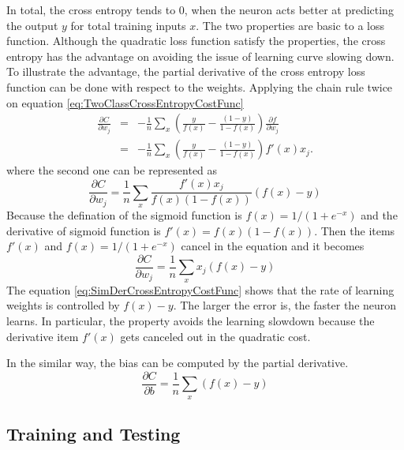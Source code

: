 In total, the cross entropy tends to $0$, when the neuron acts better at predicting the output $y$ for total training inputs $x$. The two properties are basic to a loss function. Although the quadratic loss function satisfy the properties, the cross entropy has the advantage on avoiding the issue of learning curve slowing down. To illustrate the advantage, the partial derivative of the cross entropy loss function can be done with respect to the weights. Applying the chain rule twice on equation \ref{eq:TwoClassCrossEntropyCostFunc}
\begin{eqnarray}\label{eq:DerCrossEntropyCostFunc}
  \frac{\partial C}{\partial w_j} & = & -\frac{1}{n} \sum_x \left(
    \frac{y }{f(x)} -\frac{(1-y)}{1-f(x)} \right)
  \frac{\partial f}{\partial w_j} \\
 & = & -\frac{1}{n} \sum_x \left( 
    \frac{y}{f(x)}-\frac{(1-y)}{1-f(x)} \right)f'(x) x_j.
\end{eqnarray}
where the second one can be represented as
\begin{equation}\label{eq:SecondDerCrossEntropyCostFunc}
  \frac{\partial C}{\partial w_j} = \frac{1}{n}  \sum_x \frac{f'(x) x_j}{f(x) (1-f(x))} (f(x)-y)
\end{equation}
Because the defination of the sigmoid function is $f(x) =1/(1+e^{-x})$ and the derivative of sigmoid function is $f'(x) =f(x)(1-f(x))$. Then the items $f'(x)$ and $f(x) =1/(1+e^{-x})$ cancel in the equation and it becomes
\begin{equation}\label{eq:SimDerCrossEntropyCostFunc}
 \frac{\partial C}{\partial w_j} =  \frac{1}{n} \sum_x x_j(f(x)-y)
\end{equation}
The equation \ref{eq:SimDerCrossEntropyCostFunc} shows that the rate of learning weights is controlled by $f(x) - y$. The larger the error is, the faster the neuron learns. In particular, the property avoids the learning slowdown because the derivative item $f'(x)$ gets canceled out in the quadratic cost.

In the similar way, the bias can be computed by the partial derivative.
\begin{equation}\label{eq:BiasCrossEntropyCostFunc}
\frac{\partial C}{\partial b} = \frac{1}{n} \sum_x (f(x)-y)
\end{equation}


\subsection{Training and Testing}

